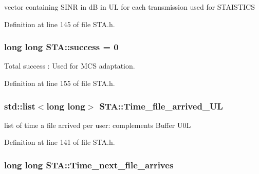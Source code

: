 vector containing S\-I\-N\-R in d\-B in U\-L for each transmission used for S\-T\-A\-I\-S\-T\-I\-C\-S 



Definition at line 145 of file S\-T\-A.\-h.

\hypertarget{classSTA_a8f2d6be8326b3e46fbf1599040bff750}{
\subsubsection[{success}]{\setlength{\rightskip}{0pt plus 5cm}long long S\-T\-A\-::success = 0}}\label{classSTA_a8f2d6be8326b3e46fbf1599040bff750}


Total success \-: Used for M\-C\-S adaptation. 



Definition at line 155 of file S\-T\-A.\-h.

\hypertarget{classSTA_a41c09b640b596903776cb5367715b1ab}{
\subsubsection[{Time\-\_\-file\-\_\-arrived\-\_\-\-U\-L}]{\setlength{\rightskip}{0pt plus 5cm}std\-::list$<$long long$>$ S\-T\-A\-::\-Time\-\_\-file\-\_\-arrived\-\_\-\-U\-L}}\label{classSTA_a41c09b640b596903776cb5367715b1ab}


list of time a file arrived per user\-: complements Buffer U0\-L 



Definition at line 141 of file S\-T\-A.\-h.

\hypertarget{classSTA_ad7653686912b61e311486017049c3612}{
\subsubsection[{Time\-\_\-next\-\_\-file\-\_\-arrives}]{\setlength{\rightskip}{0pt plus 5cm}long long S\-T\-A\-::\-Time\-\_\-next\-\_\-file\-\_\-arrives\hspace{0.3cm}{\ttfamily [private]}}}\label{classSTA_ad7653686912b61e311486017049c3612}


